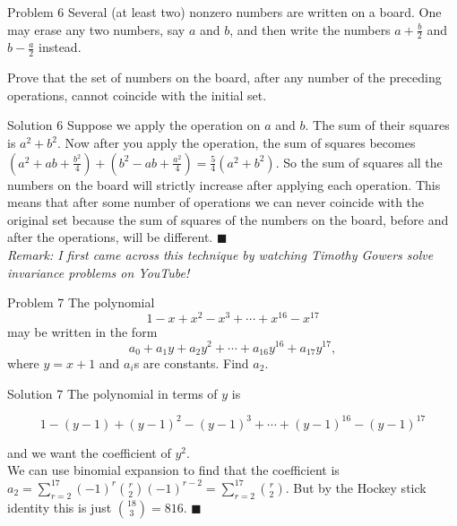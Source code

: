 \documentclass{article}
\begin{document}
\vspace{0.2cm}

\begin{problem}{Problem 6}
Several (at least two) nonzero numbers are written on a board. One may
erase any two numbers, say $a$ and $b$, and then write the numbers
$a + \frac{b}{2}$ and $b - \frac{a}{2}$ instead.

Prove that the set of numbers on the board, after any number of the
preceding operations, cannot coincide with the initial set.
\end{problem}

\begin{solution}{Solution 6}
Suppose we apply the operation on $a$ and $b$. The sum of their
squares is $a^2 + b^2$. Now after you apply the operation, the sum of
squares becomes $(a^2 + ab + \frac{b^2}{4}) + (b^2 - ab + \frac{a^2}{4}) =
\frac{5}{4} (a^2 + b^2)$. So the sum of squares all the numbers on the
board will strictly increase after applying each operation. This means that
after some number of operations we can never coincide with the original set
because the sum of squares of the numbers on the board, before and after
the operations, will be different.
$\blacksquare$
\\

\textit{Remark: I first came across this technique by watching Timothy
Gowers solve invariance problems on YouTube!}
\end{solution}

\vspace{0.2cm}

\begin{problem}{Problem 7}
The polynomial
\[
1 - x + x^{2} - x^{3} + \cdots + x^{16} - x^{17}
\]
may be written in the form
\[
a_0 + a_1 y + a_2 y^2 + \cdots + a_{16} y^{16} + a_{17} y^{17},
\]
where \( y = x + 1 \) and \( a_i \)s are constants. Find \( a_2 \).
\end{problem}

\begin{solution}{Solution 7}
The polynomial in terms of $y$ is

$$
1 - (y-1) + (y-1)^2 - (y-1)^3 + \cdots + (y-1)^{16} - (y-1)^{17}
$$

and we want the coefficient of $y^2$.\\

We can use binomial expansion to
find that the coefficient is
$ a_2 = \sum_{r=2}^{17} (-1)^r \binom{r}{2} (-1)^{r-2} =
\sum_{r=2}^{17} \binom{r}{2}$. But by the Hockey stick identity this is
just $\binom{18}{3} = 816$. $\blacksquare$

\end{solution}
\vspace{0.2cm}
\end{document}
